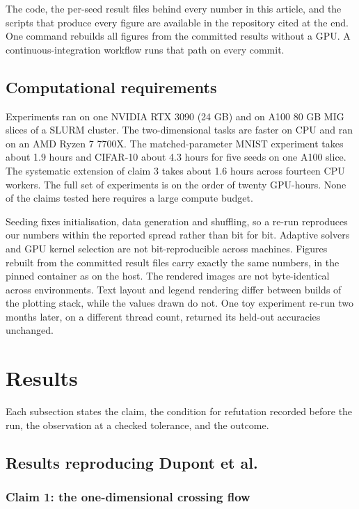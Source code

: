 The code, the per-seed result files behind every number in this article, and the scripts that
produce every figure are available in the repository cited at the end. One command rebuilds
all figures from the committed results without a GPU. A continuous-integration workflow runs
that path on every commit.

\subsection{Computational requirements}

Experiments ran on one NVIDIA RTX 3090 (24 GB) and on A100 80 GB MIG slices of a SLURM
cluster. The two-dimensional tasks are faster on CPU and ran on an AMD Ryzen 7 7700X. The
matched-parameter MNIST experiment takes about 1.9 hours and CIFAR-10 about 4.3 hours for five
seeds on one A100 slice. The systematic extension of claim 3 takes about 1.6 hours across
fourteen CPU workers. The full set of experiments is on the order of twenty GPU-hours. None of
the claims tested here requires a large compute budget.

Seeding fixes initialisation, data generation and shuffling, so a re-run reproduces our
numbers within the reported spread rather than bit for bit. Adaptive solvers and GPU kernel
selection are not bit-reproducible across machines. Figures rebuilt from the committed result files carry exactly the same
numbers, in the pinned container as on the host. The rendered images are not byte-identical
across environments. Text layout and legend rendering differ between builds of the plotting
stack, while the values drawn do not. One toy experiment re-run two months later, on a different
thread count, returned its held-out accuracies unchanged.

\section{Results}
\label{sec:results}

Each subsection states the claim, the condition for refutation recorded before the run, the
observation at a checked tolerance, and the outcome.

\subsection{Results reproducing Dupont et al.}

\subsubsection{Claim 1: the one-dimensional crossing flow}

